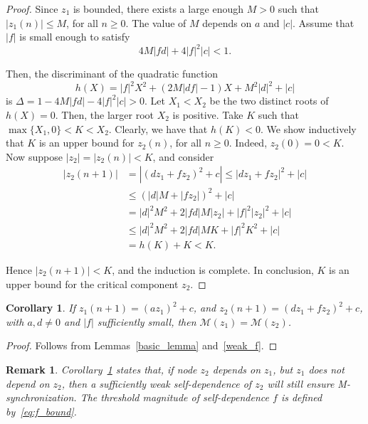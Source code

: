 \documentclass[10pt]{article}
\newtheorem{corol}[thm]{Corollary}
\newtheorem{remark}[thm]{Remark}
\begin{document}
\begin{proof}
Since $z_1$ is bounded, there exists a large enough $M > 0$ such that $|z_1(n)| \leq M$, for all $n \geq 0$. The value of $M$ depends on $a$ and $|c|$. Assume that $|f|$ is small enough to satisfy
\begin{equation} \label{eq:f_bound}
4 M |f d| + 4 |f|^2 |c| < 1.
\end{equation}

Then, the discriminant of the quadratic function
\[
h(X) = |f|^2 X^2 + (2 M |d f| - 1) X + M^2 |d|^2 + |c|
\]
is $\Delta = 1 - 4 M |f d| - 4|f|^2 |c| > 0$. Let $X_1 < X_2$ be the two distinct roots of $h(X) = 0$. Then, the larger root $X_2$ is positive. Take $K$ such that $\max \{X_1, 0\} < K < X_2$. Clearly, we have that $h(K) < 0$. We show inductively that $K$ is an upper bound for $z_2(n)$, for all $n \geq 0$. Indeed, $z_2(0) = 0 < K$. Now suppose $|z_2| = |z_2(n)| < K$, and consider
\[
\begin{aligned}
|z_2(n+1) |
    & = |(d z_1 + f z_2)^2 + c | \leq |d z_1 + f z_2 | ^2 + |c| \\
    & \leq (|d | M + |f z_2 | )^2 + |c | \\
    & = |d|^2 M^2 + 2 |f d| M |z_2| + |f|^2 |z_2|^2 + |c| \\
    & \leq |d|^2 M^2 + 2|f d| M K + |f|^2 K^2 + |c| \\
    & = h(K) + K < K.
\end{aligned}
\]

Hence $|z_2(n+1) | < K$, and the induction is complete. In conclusion, $K$ is an upper bound for the critical component $z_2$.
\end{proof}

\begin{corol} \label{f_threshold}
If $z_1(n+1) = (az_1)^2 + c$, and $z_2(n+1)=(dz_1+fz_2)^2+c$, with $a,d \neq 0$ and $|f |$ sufficiently small, then $\mathcal{M}(z_1) = \mathcal{M}(z_2)$.
\end{corol}

\begin{proof}
Follows from Lemmas~\ref{basic_lemma} and~\ref{weak_f}.
\end{proof}

\begin{remark}
Corollary~\ref{f_threshold} states that, if node $z_2$ depends on $z_1$, but $z_1$ does not depend on $z_2$, then a sufficiently weak self-dependence of $z_2$ will still ensure M-synchronization. The threshold magnitude of self-dependence $f$ is defined by~\eqref{eq:f_bound}.
\end{remark}
\end{document}
